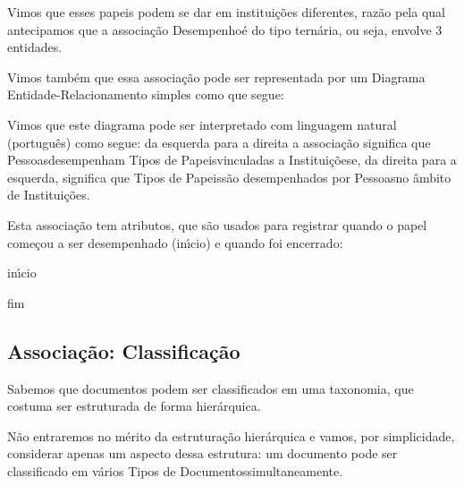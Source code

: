 \documentclass[
12pt,		%
openright,	%
twoside,  %
a4paper,			%
chapter=TITLE,		%
english,			%
french,				%
spanish,			%
brazil				%
]{USPSC-classe/USPSC}
\begin{document}
Vimos que esses papeis podem se dar em institui\c{c}\~oes diferentes, raz\~ao pela qual antecipamos que a associa\c{c}\~ao \textquotedbl Desempenho\textquotedbl  \'e do tipo tern\'aria, ou seja, envolve 3 entidades.


Vimos tamb\'em que essa associa\c{c}\~ao pode ser representada por um Diagrama Entidade-Relacionamento simples como que segue:




Vimos que este diagrama pode ser interpretado com linguagem natural (portugu\^es) como segue: da esquerda para a direita a associa\c{c}\~ao significa que \textquotedbl Pessoas\textquotedbl  desempenham \textquotedbl Tipos de Papeis\textquotedbl   vinculadas a \textquotedbl Institui\c{c}\~oes\textquotedbl  e, da direita para a esquerda, significa que \textquotedbl Tipos de Papeis\textquotedbl  s\~ao desempenhados por \textquotedbl Pessoas\textquotedbl  no \^ambito de \textquotedbl Institui\c{c}\~oes\textquotedbl .


Esta associa\c{c}\~ao tem atributos, que s\~ao usados para registrar quando o papel come\c{c}ou a ser desempenhado (in\'{\i}cio) e quando foi encerrado:



\begin{alineas}
\item in\'{\i}cio
\item fim
\end{alineas}

\subsection[Associa\c{c}\~ao: Classifica\c{c}\~ao]{Associa\c{c}\~ao: Classifica\c{c}\~ao}\label{Associa\c{c}\~ao: Classifica\c{c}\~ao}
Sabemos que documentos podem ser classificados em uma taxonomia, que costuma ser estruturada de forma hier\'arquica.


N\~ao entraremos no m\'erito da estrutura\c{c}\~ao hier\'arquica e vamos, por simplicidade, considerar apenas um aspecto dessa estrutura: um documento pode ser classificado em v\'arios \textquotedbl Tipos de Documentos\textquotedbl  simultaneamente.
\end{document}
